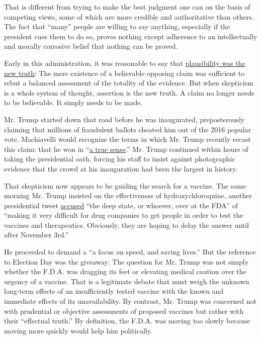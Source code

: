 That is different from trying to make the best judgment one can on the
basis of competing views, some of which are more credible and
authoritative than others. The fact that ``many'' people are willing to
say anything, especially if the president cues them to do so, proves
nothing except adherence to an intellectually and morally corrosive
belief that nothing can be proved.

Early in this administration, it was reasonable to say that
\href{https://www.nationalaffairs.com/publications/detail/trump-and-truth}{plausibility
was the new truth}: The mere existence of a believable opposing claim
was sufficient to rebut a balanced assessment of the totality of the
evidence. But when skepticism is a whole system of thought, assertion is
the new truth. A claim no longer needs to be believable. It simply needs
to be made.

Mr. Trump started down that road before he was inaugurated,
preposterously claiming that millions of fraudulent ballots cheated him
out of the 2016 popular vote. Machiavelli would recognize the terms in
which Mr. Trump recently recast this claim: that he won in
``\href{https://www.msnbc.com/rachel-maddow-show/despite-reality-trump-said-he-won-popular-vote-true-sense-n1239070}{a
true sense}.'' Mr. Trump continued within hours of taking the
presidential oath, forcing his staff to insist against photographic
evidence that the crowd at his inauguration had been the largest in
history.

That skepticism now appears to be guiding the search for a vaccine. The
same morning Mr. Trump insisted on the effectiveness of
hydroxychloroquine, another presidential tweet
\href{https://twitter.com/realdonaldtrump/status/1297138862108663808?s=11}{accused}
``the deep state, or whoever, over at the FDA'' of ``making it very
difficult for drug companies to get people in order to test the vaccines
and therapeutics. Obviously, they are hoping to delay the answer until
after November 3rd.''

He proceeded to demand a ``a focus on speed, and saving lives.'' But the
reference to Election Day was the giveaway: The question for Mr. Trump
was not simply whether the F.D.A. was dragging its feet or elevating
medical caution over the urgency of a vaccine. That is a legitimate
debate that must weigh the unknown long-term effects of an
insufficiently tested vaccine with the known and immediate effects of
its unavailability. By contrast, Mr. Trump was concerned not with
prudential or objective assessments of proposed vaccines but rather with
their ``effectual truth.'' By definition, the F.D.A. was moving too
slowly because moving more quickly would help him politically.

